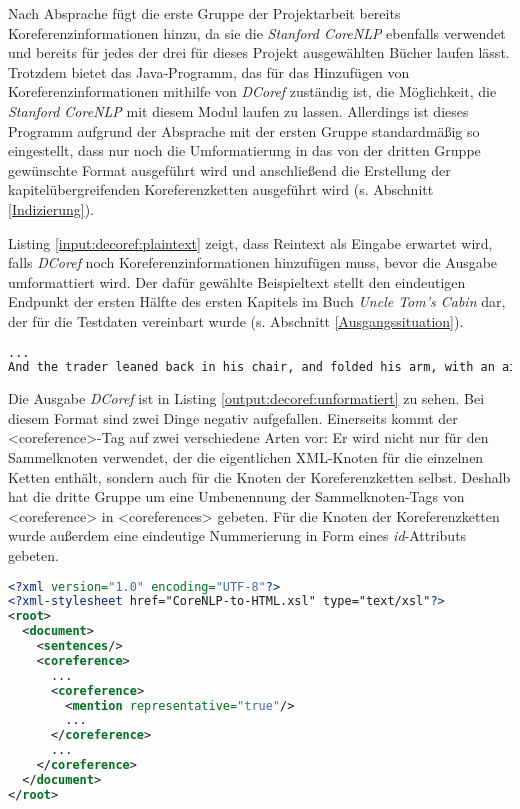 
Nach Absprache fügt die erste Gruppe der Projektarbeit bereits Koreferenzinformationen hinzu, da sie die \emph{Stanford CoreNLP} ebenfalls verwendet und bereits für jedes der drei für dieses Projekt ausgewählten Bücher laufen lässt. Trotzdem bietet das Java-Programm, das für das Hinzufügen von Koreferenzinformationen mithilfe von \emph{DCoref} zuständig ist, die Möglichkeit, die \emph{Stanford CoreNLP} mit diesem Modul laufen zu lassen. Allerdings ist dieses Programm aufgrund der Absprache mit der ersten Gruppe standardmäßig so eingestellt, dass nur noch die Umformatierung in das von der dritten Gruppe gewünschte Format ausgeführt wird und anschließend die Erstellung der kapitelübergreifenden Koreferenzketten ausgeführt wird (s. Abschnitt \ref{Indizierung}).

Listing \ref{input:decoref:plaintext} zeigt, dass Reintext als Eingabe erwartet wird, falls \emph{DCoref} noch Koreferenzinformationen hinzufügen muss, bevor die Ausgabe umformattiert wird. Der dafür gewählte Beispieltext stellt den eindeutigen Endpunkt der ersten Hälfte des ersten Kapitels im Buch \emph{Uncle Tom's Cabin} \autocite[]{chris_uncle} dar, der für die Testdaten vereinbart wurde (s. Abschnitt \ref{Ausgangssituation}).

\begin{lstlisting}[label=input:decoref:plaintext, name=decoref_in_plain.xml, language=xml, caption={Reintext, Eingabe für \emph{DCoref}}]
...
And the trader leaned back in his chair, and folded his arm, with an air of virtuous decision, apparently considering himself a second Wilberforce. 
\end{lstlisting}

\noindent Die Ausgabe \emph{DCoref} ist in Listing \ref{output:decoref:unformatiert} zu sehen. Bei diesem Format sind zwei Dinge negativ aufgefallen. Einerseits kommt der <coreference>-Tag auf zwei verschiedene Arten vor: Er wird nicht nur für den Sammelknoten verwendet, der die eigentlichen XML-Knoten für die einzelnen Ketten enthält, sondern auch für die Knoten der Koreferenzketten selbst. Deshalb hat die dritte Gruppe um eine Umbenennung der Sammelknoten-Tags von <coreference> in <coreferences> gebeten. Für die Knoten der Koreferenzketten wurde außerdem eine eindeutige Nummerierung in Form eines \emph{id}-Attributs gebeten. 

\begin{lstlisting}[label=output:decoref:unformatiert, name=decoref_out.xml, language=xml, caption={XML, Unformatierte Ausgabe von \emph{DCoref}}]
<?xml version="1.0" encoding="UTF-8"?>
<?xml-stylesheet href="CoreNLP-to-HTML.xsl" type="text/xsl"?>
<root>
  <document>
    <sentences/>
    <coreference>
      ...
      <coreference>
        <mention representative="true"/>
        ...
      </coreference>
      ...
    </coreference>
  </document>
</root>
\end{lstlisting}

